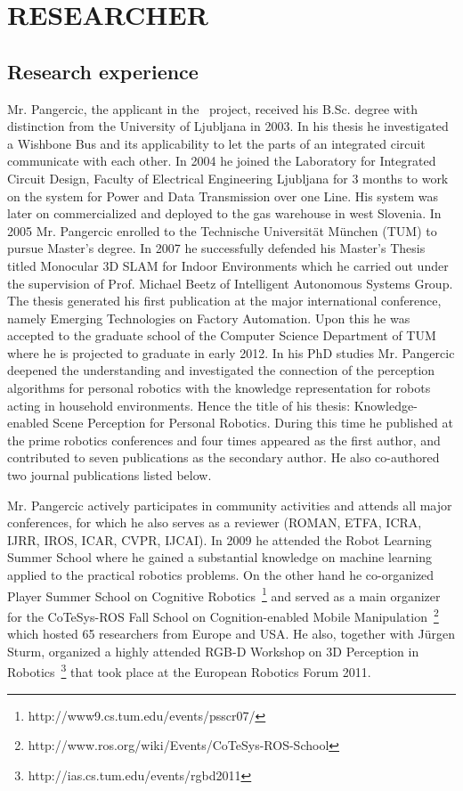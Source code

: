 \section{RESEARCHER} %
\label{sec:researcher}
\subsection{Research experience}
Mr. Pangercic, the applicant in the \ksem\ project, received his B.Sc. degree
with distinction from the University of Ljubljana in 2003. In his thesis he investigated
a Wishbone Bus and its applicability to let the parts of an integrated circuit communicate with each other.
In 2004 he joined the Laboratory for Integrated Circuit Design, Faculty of Electrical Engineering
Ljubljana for 3 months to work on the system for Power and Data Transmission over one Line.
His system was later on commercialized and deployed to the gas warehouse in west Slovenia.
In 2005 Mr. Pangercic enrolled to the Technische Universit\"at M\"unchen (TUM) to pursue Master's
degree. In 2007 he successfully defended his Master's Thesis titled Monocular 3D SLAM for Indoor Environments
which he carried out under the supervision of Prof. Michael Beetz of Intelligent Autonomous Systems Group.
The thesis generated his first publication at the major international conference, namely
Emerging Technologies on Factory Automation. Upon this he was accepted to the graduate school
of the Computer Science Department of TUM where he is projected to graduate in early 2012.
In his PhD studies Mr. Pangercic deepened the understanding and investigated the connection of the 
perception algorithms for personal robotics with the knowledge representation for robots
acting in household environments. Hence the title of his thesis: Knowledge-enabled Scene Perception for Personal Robotics.
During this time he published at the prime robotics conferences and four times appeared as the first author, 
and contributed to seven publications as the secondary author. He also co-authored two journal publications listed below.

Mr. Pangercic actively participates in community activities and attends all major conferences, for 
which he also serves as a reviewer (ROMAN, ETFA, ICRA, IJRR, IROS, ICAR, CVPR, IJCAI). In 2009 he 
attended the Robot Learning Summer School where he gained a substantial knowledge on machine learning 
applied to the practical robotics problems. On the other hand he co-organized Player Summer School on 
Cognitive Robotics~\footnote{http://www9.cs.tum.edu/events/psscr07/} and 
served as a main organizer for the CoTeSys-ROS Fall School on Cognition-enabled Mobile 
Manipulation~\footnote{http://www.ros.org/wiki/Events/CoTeSys-ROS-School} which hosted 
65 researchers from Europe and USA. He also, together with J\"urgen Sturm, organized a highly 
attended RGB-D Workshop on 3D Perception in Robotics~\footnote{http://ias.cs.tum.edu/events/rgbd2011} 
that took place at the European Robotics Forum 2011.


